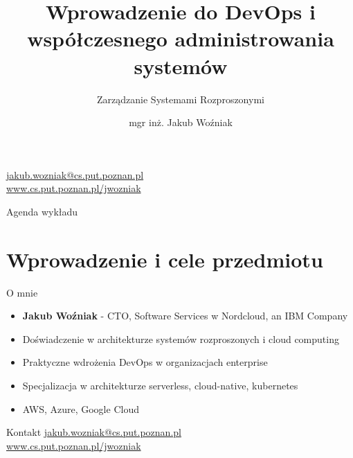 \documentclass[10pt, aspectratio=169]{beamer}
\title[DevOps i współczesne administrowanie]{Wprowadzenie do DevOps i współczesnego administrowania systemów}
\subtitle{Zarządzanie Systemami Rozproszonymi}
\author[J. Woźniak]{mgr inż. Jakub Woźniak}
\institute[PUT]{Politechnika Poznańska\\Wydział Informatyki i Telekomunikacji}
\date{}
\begin{document}
\begin{frame}
\titlepage
\begin{center}
\small
\href{mailto:jakub.wozniak@cs.put.poznan.pl}{jakub.wozniak@cs.put.poznan.pl}\\
\href{https://www.cs.put.poznan.pl/jwozniak}{www.cs.put.poznan.pl/jwozniak}
\end{center}
\end{frame}

\begin{frame}{Agenda wykładu}
\tableofcontents
\end{frame}

\section{Wprowadzenie i cele przedmiotu}

\begin{frame}{O mnie}
\begin{itemize}
\item \textbf{Jakub Woźniak} - CTO, Software Services w Nordcloud, an IBM Company
\item Doświadczenie w architekturze systemów rozproszonych i cloud computing
\item Praktyczne wdrożenia DevOps w organizacjach enterprise
\item Specjalizacja w architekturze serverless, cloud-native, kubernetes
\item AWS, Azure, Google Cloud
\end{itemize}

\vspace{1cm}
\begin{block}{Kontakt}
\href{mailto:jakub.wozniak@cs.put.poznan.pl}{jakub.wozniak@cs.put.poznan.pl}\\
\href{https://www.cs.put.poznan.pl/jwozniak}{www.cs.put.poznan.pl/jwozniak}
\end{block}
\end{frame}
\end{document}
